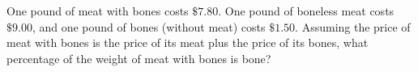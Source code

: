 One pound of meat with bones costs $\$7.80$. One pound of boneless meat costs $\$9.00$, and one pound of bones (without meat) costs $\$1.50$. Assuming the price of meat with bones is the price of its meat plus the price of its bones, what percentage of the weight of meat with bones is bone?
